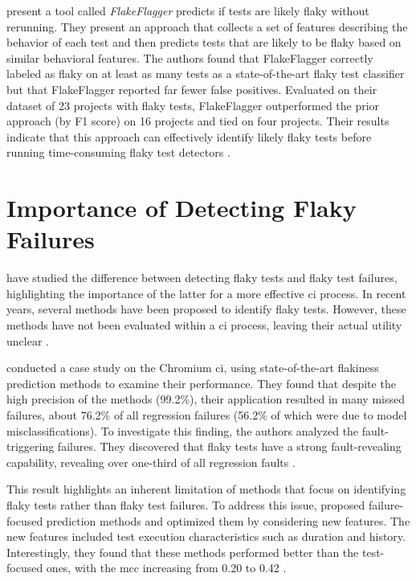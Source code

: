  present a tool called \emph{FlakeFlagger} predicts if tests are likely flaky without rerunning.
They present an approach that collects a set of features describing the behavior of each test and then predicts tests that are likely to be flaky based on similar behavioral features.
The authors found that FlakeFlagger correctly labeled as flaky on at least as many tests as a state-of-the-art flaky test classifier but that FlakeFlagger reported far fewer false positives.
Evaluated on their dataset of 23 projects with flaky tests, FlakeFlagger outperformed the prior approach (by F1 score) on 16 projects and tied on four projects.
Their results indicate that this approach can effectively identify likely flaky tests before running time-consuming flaky test detectors \autocite{alshammari_flakeflagger_2021}.

\section{Importance of Detecting Flaky Failures}
 have studied the difference between detecting flaky tests and flaky test failures, highlighting the importance of the latter for a more effective \ac{ci} process.
In recent years, several methods have been proposed to identify flaky tests.
However, these methods have not been evaluated within a \ac{ci} process, leaving their actual utility unclear \autocite{haben_importance_2023}.

 conducted a case study on the Chromium \ac{ci}, using state-of-the-art flakiness prediction methods to examine their performance.
They found that despite the high precision of the methods (99.2\%), their application resulted in many missed failures, about 76.2\% of all regression failures (56.2\% of which were due to model misclassifications).
To investigate this finding, the authors analyzed the fault-triggering failures. They discovered that flaky tests have a strong fault-revealing capability, revealing over one-third of all regression faults \autocite{haben_importance_2023}.

This result highlights an inherent limitation of methods that focus on identifying flaky tests rather than flaky test failures.
To address this issue,  proposed failure-focused prediction methods and optimized them by considering new features.
The new features included test execution characteristics such as duration and history.
Interestingly, they found that these methods performed better than the test-focused ones, with the \ac{mcc} increasing from 0.20 to 0.42 \autocite{haben_importance_2023}.

